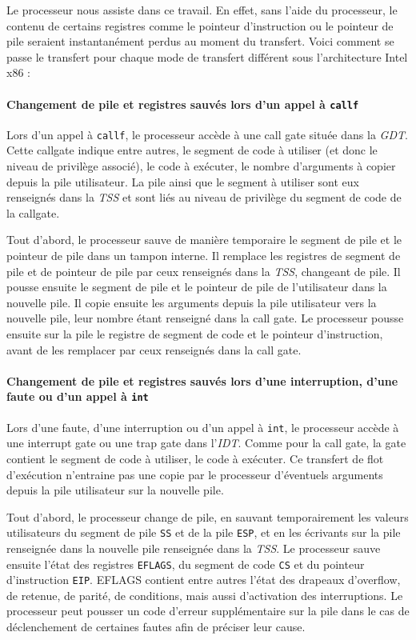 Le processeur nous assiste dans ce travail. En effet, sans l'aide du processeur, le contenu de certains registres comme le pointeur d'instruction ou le pointeur de pile seraient instantanément perdus au moment du transfert. Voici comment se passe le transfert pour chaque mode de transfert différent sous l'architecture Intel x86 : 


\paragraph{Changement de pile et registres sauvés lors d'un appel à \texttt{callf}}

Lors d'un appel à \texttt{callf}, le processeur accède à une call gate située dans la \emph{GDT}. Cette callgate indique entre autres, le segment de code à utiliser (et donc le niveau de privilège associé), le code à exécuter, le nombre d'arguments à copier depuis la pile utilisateur. La pile ainsi que le segment à utiliser sont eux renseignés dans la \emph{TSS} et sont liés au niveau de privilège du segment de code de la callgate.

Tout d'abord, le processeur sauve de manière temporaire le segment de pile et le pointeur de pile dans un tampon interne. Il remplace les registres de segment de pile et de pointeur de pile par ceux renseignés dans la \emph{TSS}, changeant de pile. Il pousse ensuite le segment de pile et le pointeur de pile de l'utilisateur dans la nouvelle pile. Il copie ensuite les arguments depuis la pile utilisateur vers la nouvelle pile, leur nombre étant renseigné dans la call gate. Le processeur pousse ensuite sur la pile le registre de segment de code et le pointeur d'instruction, avant de les remplacer par ceux renseignés dans la call gate.

\paragraph{Changement de pile et registres sauvés lors d'une interruption, d'une faute ou d'un appel à \texttt{int}}

Lors d'une faute, d'une interruption ou d'un appel à \texttt{int}, le processeur accède à une interrupt gate ou une trap gate dans l'\emph{IDT}. Comme pour la call gate, la gate contient le segment de code à utiliser, le code à exécuter. Ce transfert de flot d'exécution n'entraine pas une copie par le processeur d'éventuels arguments depuis la pile utilisateur sur la nouvelle pile.

Tout d'abord, le processeur change de pile, en sauvant temporairement les valeurs utilisateurs du segment de pile \texttt{SS} et de la pile \texttt{ESP}, et en les écrivants sur la pile renseignée dans la nouvelle pile renseignée dans la \emph{TSS}. Le processeur sauve ensuite l'état des registres \texttt{EFLAGS}, du segment de code \texttt{CS} et du pointeur d'instruction \texttt{EIP}. EFLAGS contient entre autres l'état des drapeaux d'overflow, de retenue, de parité, de conditions, mais aussi d'activation des interruptions. Le processeur peut pousser un code d'erreur supplémentaire sur la pile dans le cas de déclenchement de certaines fautes afin de préciser leur cause.

